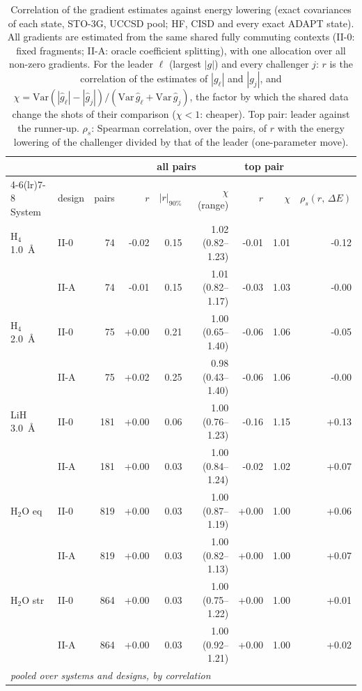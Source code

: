 \begin{table}[!htb]
\centering\small
\caption{Correlation of the gradient estimates against energy lowering (exact covariances of each state, STO-3G, UCCSD pool; HF, CISD and every exact ADAPT state). All gradients are estimated from the same shared fully commuting contexts (II-0: fixed fragments; II-A: oracle coefficient splitting), with one allocation over all non-zero gradients. For the leader $\ell$ (largest $|g|$) and every challenger $j$: $r$ is the correlation of the estimates of $|g_\ell|$ and $|g_j|$, and $\chi=\mathrm{Var}(|\hat g_\ell|-|\hat g_j|)/(\mathrm{Var}\,\hat g_\ell+\mathrm{Var}\,\hat g_j)$, the factor by which the shared data change the shots of their comparison ($\chi<1$: cheaper). Top pair: leader against the runner-up. $\rho_s$: Spearman correlation, over the pairs, of $r$ with the energy lowering of the challenger divided by that of the leader (one-parameter move).}
\label{tab:corr_energy}
\footnotesize\setlength{\tabcolsep}{3pt}
\begin{tabular}{llrrrrrrr}
\toprule
 & & & \multicolumn{3}{c}{all pairs} & \multicolumn{2}{c}{top pair} & \\
\cmidrule(lr){4-6}\cmidrule(lr){7-8}
System & design & pairs & $r$ & $|r|_{90\%}$ & $\chi$ (range) & $r$ & $\chi$ & $\rho_s(r,\,\Delta E)$ \\
\midrule
H$_4$ 1.0~\AA & II-0 & 74 & -0.02 & 0.15 & 1.02 (0.82--1.23) & -0.01 & 1.01 & -0.12 \\
 & II-A & 74 & -0.01 & 0.15 & 1.01 (0.82--1.17) & -0.03 & 1.03 & -0.00 \\
H$_4$ 2.0~\AA & II-0 & 75 & +0.00 & 0.21 & 1.00 (0.65--1.40) & -0.06 & 1.06 & -0.05 \\
 & II-A & 75 & +0.02 & 0.25 & 0.98 (0.43--1.40) & -0.06 & 1.06 & -0.00 \\
LiH 3.0~\AA & II-0 & 181 & +0.00 & 0.06 & 1.00 (0.76--1.23) & -0.16 & 1.15 & +0.13 \\
 & II-A & 181 & +0.00 & 0.03 & 1.00 (0.84--1.24) & -0.02 & 1.02 & +0.07 \\
H$_2$O eq & II-0 & 819 & +0.00 & 0.03 & 1.00 (0.87--1.19) & +0.00 & 1.00 & +0.06 \\
 & II-A & 819 & +0.00 & 0.03 & 1.00 (0.82--1.13) & +0.00 & 1.00 & +0.07 \\
H$_2$O str & II-0 & 864 & +0.00 & 0.03 & 1.00 (0.75--1.22) & +0.00 & 1.00 & +0.01 \\
 & II-A & 864 & +0.00 & 0.03 & 1.00 (0.92--1.21) & +0.00 & 1.00 & +0.02 \\
\midrule
\multicolumn{9}{l}{\emph{pooled over systems and designs, by correlation}} \\

\end{tabular}
\end{table}
